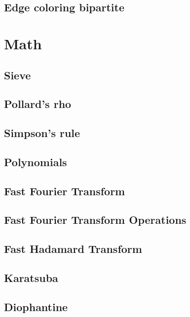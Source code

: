 \subsection{Edge coloring bipartite}

\section{Math}

\subsection{Sieve}

\subsection{Pollard's rho}

\subsection{Simpson's rule}

\subsection{Polynomials}

\subsection{Fast Fourier Transform}

\subsection{Fast Fourier Transform Operations}

\subsection{Fast Hadamard Transform}

\subsection{Karatsuba}

\subsection{Diophantine}

